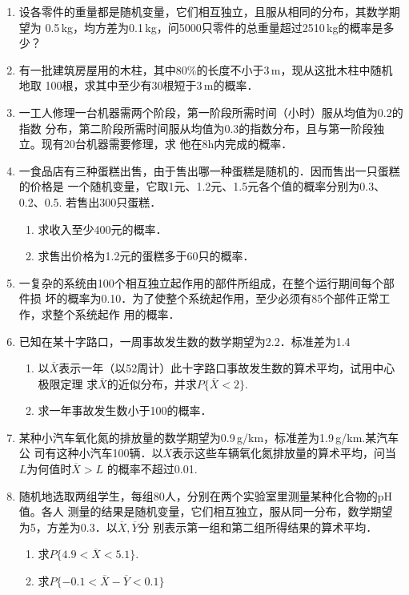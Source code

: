 \begin{enumerate}
    \item 设各零件的重量都是随机变量，它们相互独立，且服从相同的分布，其数学期望为
    0.5$\, $kg，均方差为0.1$\, $kg，问5000只零件的总重量超过2510$\, $kg的概率是多少？



    \item 有一批建筑房屋用的木柱，其中80\%的长度不小于3$\, $m，现从这批木柱中随机地取
    100根，求其中至少有30根短于3$\, $m的概率．


    \item 一工人修理一台机器需两个阶段，第一阶段所需时间（小时）服从均值为0.2的指数
    分布，第二阶段所需时间服从均值为0.3的指数分布，且与第一阶段独立。现有20台机器需要修理，求
    他在8h内完成的概率．


    \item 一食品店有三种蛋糕出售，由于售出哪一种蛋糕是随机的．因而售出一只蛋糕的价格是
    一个随机变量，它取1元、1.2元、1.5元各个值的概率分别为0.3、0.2、0.5. 若售出300只蛋糕．
    \begin{enumerate}
        \item 求收入至少400元的概率．
        \item 求售出价格为1.2元的蛋糕多于60只的概率．
    \end{enumerate}



    \item 一复杂的系统由100个相互独立起作用的部件所组成，在整个运行期间每个部件损
    坏的概率为0.10．为了使整个系统起作用，至少必须有85个部件正常工作，求整个系统起作
    用的概率．


    \item 已知在某十字路口，一周事故发生数的数学期望为2.2．标准差为1.4
    \begin{enumerate}
        \item 以$\overline{X}$表示一年（以52周计）此十字路口事故发生数的算术平均，试用中心极限定理
        求$\overline{X}$的近似分布，并求$P\{\overline{X}<2\}$.
        \item 求一年事故发生数小于100的概率．
    \end{enumerate}


    \item 某种小汽车氧化氮的排放量的数学期望为0.9$\, $g/km，标准差为1.9$\, $g/km.某汽车公
    司有这种小汽车100辆．以$\overline{X}$表示这些车辆氧化氮排放量的算术平均，问当$L$为何值时$\overline{X}>L$
    的概率不超过0.01.



    \item 随机地选取两组学生，每组80人，分别在两个实验室里测量某种化合物的pH值。各人
    测量的结果是随机变量，它们相互独立，服从同一分布，数学期望为5，方差为0.3．以$\overline{X},\overline{Y}$分
    别表示第一组和第二组所得结果的算术平均．
    \begin{enumerate}
        \item 求$P\{4.9<\overline{X}<5.1\}$.
        \item 求$P\{-0.1<\overline{X}-\overline{Y}<0.1\}$
    \end{enumerate}




\end{enumerate}
